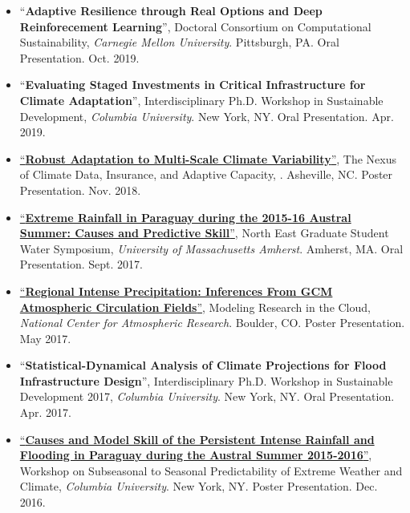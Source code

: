 \documentclass[11pt,article,oneside]{memoir}
\begin{document}
\begin{itemize}[label={}]

  \item \enquote{\textbf{Adaptive Resilience through Real Options and Deep Reinforecement Learning}}, Doctoral Consortium on Computational Sustainability,  \textit{Carnegie Mellon University}. Pittsburgh,  PA. Oral Presentation. Oct. 2019.

  \item \enquote{\textbf{Evaluating Staged Investments in Critical Infrastructure for Climate Adaptation}}, Interdisciplinary Ph.D. Workshop in Sustainable Development,  \textit{Columbia University}. New York, NY. Oral Presentation. Apr. 2019.

  \item \href{https://doi.org/10.6084/m9.figshare.8277002.v1}{\enquote{\textbf{Robust Adaptation to Multi-Scale Climate Variability}}}, The Nexus of Climate Data, Insurance, and Adaptive Capacity,  \textit{}. Asheville, NC. Poster Presentation. Nov. 2018.

  \item \href{https://doi.org/10.6084/m9.figshare.8277128.v2}{\enquote{\textbf{Extreme Rainfall in Paraguay during the 2015-16 Austral Summer: Causes and Predictive Skill}}}, North East Graduate Student Water Symposium,  \textit{University of Massachusetts Amherst}. Amherst, MA. Oral Presentation. Sept. 2017.

  \item \href{https://doi.org/10.6084/m9.figshare.8277167.v1}{\enquote{\textbf{Regional Intense Precipitation: Inferences From GCM Atmospheric Circulation Fields}}}, Modeling Research in the Cloud,  \textit{National Center for Atmospheric Research}. Boulder, CO. Poster Presentation. May 2017.

  \item \enquote{\textbf{Statistical-Dynamical Analysis of Climate Projections for Flood Infrastructure Design}}, Interdisciplinary Ph.D. Workshop in Sustainable Development 2017,  \textit{Columbia University}. New York, NY. Oral Presentation. Apr. 2017.

  \item \href{https://doi.org/10.13140/RG.2.2.20146.30406}{\enquote{\textbf{Causes and Model Skill of the Persistent Intense Rainfall and Flooding in Paraguay during the Austral Summer 2015-2016}}}, Workshop on Subseasonal to Seasonal Predictability of Extreme Weather and Climate,  \textit{Columbia University}. New York, NY. Poster Presentation. Dec. 2016.

\end{itemize}
\end{document}
